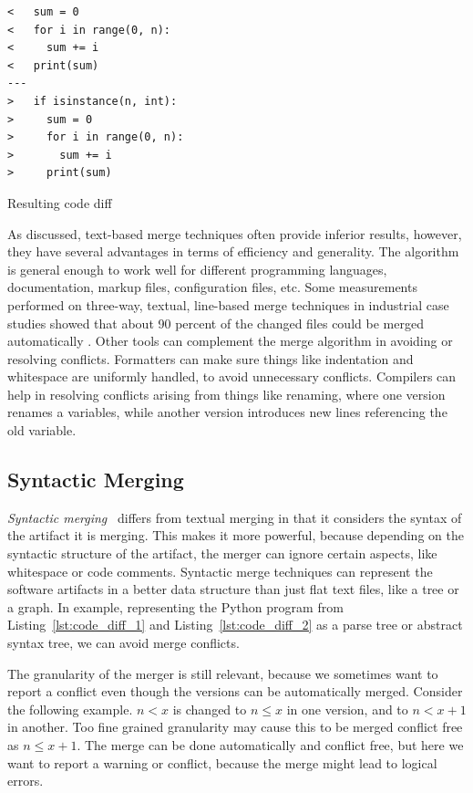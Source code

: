 \documentclass[a4paper,english]{ifimaster}
\begin{document}
\begin{listing}
	\begin{verbatim}
<   sum = 0
<   for i in range(0, n):
<     sum += i
<   print(sum)
---
>   if isinstance(n, int):
>     sum = 0
>     for i in range(0, n):
>       sum += i
>     print(sum)
  \end{verbatim}
	\caption{Resulting code diff}
	\label{lst:result_code_diff}
\end{listing}

As discussed, text-based merge techniques often provide inferior results, however, they have several advantages in terms of efficiency and generality. The algorithm is general enough to work well for different programming languages, documentation, markup files, configuration files, etc. Some measurements performed on three-way, textual, line-based merge techniques in industrial case studies showed that about 90 percent of the changed files could be merged automatically \cite{cite:large_scale_case_study}. Other tools can complement the merge algorithm in avoiding or resolving conflicts. Formatters can make sure things like indentation and whitespace are uniformly handled, to avoid unnecessary conflicts. Compilers can help in resolving conflicts arising from things like renaming, where one version renames a variables, while another version introduces new lines referencing the old variable.

\subsection{Syntactic Merging}%
\label{sub:syntactic_merging}

\textit{Syntactic merging}~\cite{cite:syntactic_software_merging} differs from textual merging in that it considers the syntax of the artifact it is merging. This makes it more powerful, because depending on the syntactic structure of the artifact, the merger can ignore certain aspects, like whitespace or code comments. Syntactic merge techniques can represent the software artifacts in a better data structure than just flat text files, like a tree or a graph. In example, representing the Python program from Listing~\vref{lst:code_diff_1} and Listing~\vref{lst:code_diff_2} as a parse tree or abstract syntax tree, we can avoid merge conflicts.

The granularity of the merger is still relevant, because we sometimes want to report a conflict even though the versions can be automatically merged. Consider the following example. $n < x$ is changed to $n \leq x$ in one version, and to $n < x + 1$ in another. Too fine grained granularity may cause this to be merged conflict free as $n \leq x + 1$. The merge can be done automatically and conflict free, but here we want to report a warning or conflict, because the merge might lead to logical errors.
\end{document}
